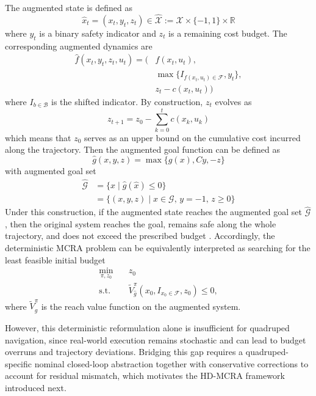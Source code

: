 \documentclass[conference]{IEEEtran}
\begin{document}
The augmented state is defined as
\begin{equation}
\hat{x}_t=(x_t,y_t,z_t)\in \hat{\mathcal{X}}:=\mathcal{X}\times\{-1,1\}\times\mathbb{R}
\end{equation}
where $y_t$ is a binary safety indicator and $z_t$ is a remaining cost budget. The corresponding augmented dynamics are
\begin{equation}
\begin{aligned}
\hat{f}(x_t,y_t,z_t,u_t)
= \big(&f(x_t,u_t), \\
&\max\{I_{f(x_t,u_t)\in\mathcal{F}},y_t\}, \\
&z_t-c(x_t,u_t)\big)
\end{aligned}
\end{equation}
where $I_{b\in\mathcal{B}}$ is the shifted indicator. By construction, $z_t$ evolves as
\begin{equation}
z_{t+1}=z_0-\sum_{k=0}^{t} c(x_k,u_k)
\end{equation}
which means that $z_0$ serves as an upper bound on the cumulative cost incurred along the trajectory. Then the augmented goal function can be defined as
\begin{equation}
\hat{g}(x,y,z)=\max\{g(x),Cy,-z\}
\end{equation}
with augmented goal set
\begin{equation}
\begin{aligned}
\hat{\mathcal{G}}
&=\{\hat{x}\mid \hat{g}(\hat{x})\le 0\} \\
&=\{(x,y,z)\mid x\in\mathcal{G},\, y=-1,\, z\ge 0\}
\end{aligned}
\end{equation}
Under this construction, if the augmented state reaches the augmented goal set $\hat{\mathcal{G}}$, then the original system reaches the goal, remains safe along the whole trajectory, and does not exceed the prescribed budget \cite{DBLP:conf/nips/SoGF24}. Accordingly, the deterministic MCRA problem can be equivalently interpreted as searching for the least feasible initial budget
\begin{align}
\min_{\pi,z_0}\quad & z_0 \\
\mathrm{s.t.}\quad & \tilde{V}^{\pi}_{\hat{g}}(x_0,I_{x_0\in\mathcal{F}},z_0)\le 0,
\end{align}
where $\tilde{V}^{\pi}_{\hat{g}}$ is the reach value function on the augmented system.

However, this deterministic reformulation alone is insufficient for quadruped navigation, since real-world execution remains stochastic and can lead to budget overruns and trajectory deviations. Bridging this gap requires a quadruped-specific nominal closed-loop abstraction together with conservative corrections to account for residual mismatch, which motivates the HD-MCRA framework introduced next.
\end{document}
